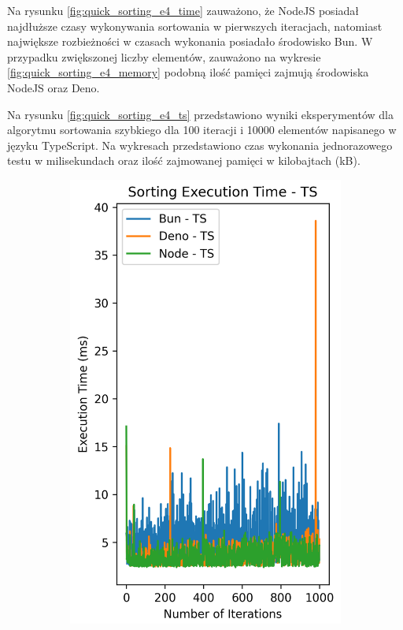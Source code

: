 Na rysunku \ref{fig:quick_sorting_e4_time} zauważono, że NodeJS posiadał najdłuższe czasy wykonywania sortowania w pierwszych iteracjach, natomiast największe rozbieżności w czasach wykonania posiadało środowisko Bun. W przypadku zwiększonej liczby elementów, zauważono na wykresie \ref{fig:quick_sorting_e4_memory} podobną ilość pamięci zajmują środowiska NodeJS oraz Deno.

Na rysunku \ref{fig:quick_sorting_e4_ts} przedstawiono wyniki eksperymentów dla algorytmu sortowania szybkiego dla 100 iteracji i 10000 elementów napisanego w języku TypeScript. Na wykresach przedstawiono czas wykonania jednorazowego testu w milisekundach oraz ilość zajmowanej pamięci w kilobajtach (kB).

\begin{figure}[H]
  \centering
  \begin{subfigure}[b]{0.44\textwidth}
    \centering
    \includegraphics[width=\textwidth]{Figures/sorting/sorting_quick_1000_10000_ts_time.png}

\end{subfigure}
\end{figure}
